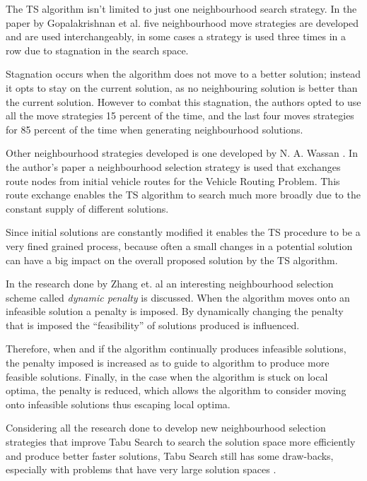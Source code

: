 The TS algorithm isn't limited to just one neighbourhood search strategy. In the paper by Gopalakrishnan et al.\cite{TabuCarryOver} five neighbourhood move strategies are developed and are used interchangeably, in some cases a strategy is used three times in a row due to stagnation in the search space. 

Stagnation occurs when the algorithm does not move to a better solution; instead it opts to stay on the current solution, as no neighbouring solution is better than the current solution. However to combat this stagnation, the authors opted to use all the move strategies 15 percent of the time, and the last four moves strategies for 85 percent of the time when generating neighbourhood solutions.

Other neighbourhood strategies developed is one developed by N. A. Wassan \cite{ReactiveTabuVHR}. In the author's paper a neighbourhood selection strategy is used that exchanges route nodes from initial vehicle routes for the Vehicle Routing Problem. This route exchange enables the TS algorithm to search much more broadly due to the constant supply of different solutions. 

Since initial solutions are constantly modified it enables the TS procedure to be a very fined grained process, because often a small changes in a potential solution can have a big impact on the overall proposed solution by the TS algorithm.

In the research done by Zhang et. al \cite{TSHazardous} an interesting neighbourhood selection scheme called \emph{dynamic penalty} is discussed. When the algorithm moves onto an infeasible solution a penalty is imposed. By dynamically changing the penalty that is imposed the ``feasibility'' of solutions produced is influenced. 

Therefore, when and if the algorithm continually produces infeasible solutions, the penalty imposed is increased as to guide to algorithm to produce more feasible solutions. Finally, in the case when the algorithm is stuck on local optima, the penalty is reduced, which allows the algorithm to consider moving onto infeasible solutions thus escaping local optima.

Considering all the research done to develop new neighbourhood selection strategies that improve Tabu Search to search the solution space more efficiently and produce better faster solutions, Tabu Search still has some draw-backs, especially with problems that have very large solution spaces \cite{EvoParallelTabu}.

